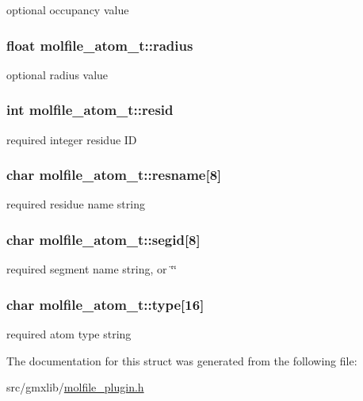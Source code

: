 optional occupancy value \hypertarget{structmolfile__atom__t_ac6ad7768d0b95289f48bac4e5cfb556c}{
\subsubsection[{radius}]{\setlength{\rightskip}{0pt plus 5cm}float {\bf molfile\-\_\-atom\-\_\-t\-::radius}}}\label{structmolfile__atom__t_ac6ad7768d0b95289f48bac4e5cfb556c}
optional radius value \hypertarget{structmolfile__atom__t_ad80e5df65fedf1ef6d61f3846ba896fa}{
\subsubsection[{resid}]{\setlength{\rightskip}{0pt plus 5cm}int {\bf molfile\-\_\-atom\-\_\-t\-::resid}}}\label{structmolfile__atom__t_ad80e5df65fedf1ef6d61f3846ba896fa}
required integer residue \-I\-D \hypertarget{structmolfile__atom__t_a8efb6a7bcdb236f2099f999151c610a5}{
\subsubsection[{resname}]{\setlength{\rightskip}{0pt plus 5cm}char {\bf molfile\-\_\-atom\-\_\-t\-::resname}\mbox{[}8\mbox{]}}}\label{structmolfile__atom__t_a8efb6a7bcdb236f2099f999151c610a5}
required residue name string \hypertarget{structmolfile__atom__t_af5ffd7e65b937a913d23ebc75d5954b1}{
\subsubsection[{segid}]{\setlength{\rightskip}{0pt plus 5cm}char {\bf molfile\-\_\-atom\-\_\-t\-::segid}\mbox{[}8\mbox{]}}}\label{structmolfile__atom__t_af5ffd7e65b937a913d23ebc75d5954b1}
required segment name string, or \char`\"{}\char`\"{} \hypertarget{structmolfile__atom__t_a9bc13f9db0e6b5a3267391b183d04d3d}{
\subsubsection[{type}]{\setlength{\rightskip}{0pt plus 5cm}char {\bf molfile\-\_\-atom\-\_\-t\-::type}\mbox{[}16\mbox{]}}}\label{structmolfile__atom__t_a9bc13f9db0e6b5a3267391b183d04d3d}
required atom type string 

\-The documentation for this struct was generated from the following file\-:\begin{DoxyCompactItemize}
\item 
src/gmxlib/\hyperlink{molfile__plugin_8h}{molfile\-\_\-plugin.\-h}\end{DoxyCompactItemize}
